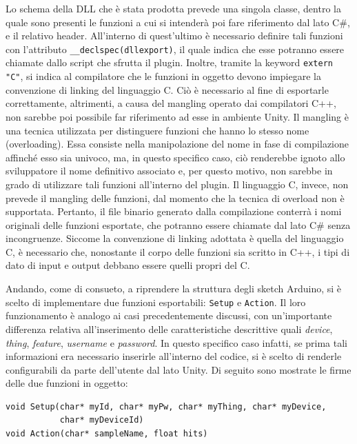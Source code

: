Lo schema della DLL che è stata prodotta prevede una singola classe, dentro la quale sono presenti le funzioni a cui si intenderà poi fare riferimento dal lato C\#, e il relativo header. All'interno di quest'ultimo è necessario definire tali funzioni con l’attributo \texttt{\_\_declspec(dllexport)}, il quale indica che esse potranno essere chiamate dallo script che sfrutta il plugin. Inoltre, tramite la keyword \texttt{extern "C"}, si indica al compilatore che le funzioni in oggetto devono impiegare la convenzione di linking del linguaggio C. Ciò è necessario al fine di esportarle correttamente, altrimenti, a causa del mangling operato dai compilatori C++, non sarebbe poi possibile far riferimento ad esse in ambiente Unity. Il mangling è una tecnica utilizzata per distinguere funzioni che hanno lo stesso nome (overloading). Essa consiste nella manipolazione del nome in fase di compilazione affinché esso sia univoco, ma, in questo specifico caso, ciò renderebbe ignoto allo sviluppatore il nome definitivo associato e, per questo motivo, non sarebbe in grado di utilizzare tali funzioni all'interno del plugin. Il linguaggio C, invece, non prevede il mangling delle funzioni, dal momento che la tecnica di overload non è supportata. Pertanto, il file binario generato dalla compilazione conterrà i nomi originali delle funzioni esportate, che potranno essere chiamate dal lato C\# senza incongruenze. Siccome la convenzione di linking adottata è quella del linguaggio C, è necessario che, nonostante il corpo delle funzioni sia scritto in C++, i tipi di dato di input e output debbano essere quelli propri del C.

Andando, come di consueto, a riprendere la struttura degli sketch Arduino, si è scelto di implementare due funzioni esportabili: \texttt{Setup} e \texttt{Action}. Il loro funzionamento è analogo ai casi precedentemente discussi, con un’importante differenza relativa all’inserimento delle caratteristiche descrittive quali \textit{device}, \textit{thing}, \textit{feature}, \textit{username} e \textit{password}. In questo specifico caso infatti, se prima tali informazioni era necessario inserirle all'interno del codice, si è scelto di renderle configurabili da parte dell'utente dal lato Unity. Di seguito sono mostrate le firme delle due funzioni in oggetto:

\begin{verbatim}
void Setup(char* myId, char* myPw, char* myThing, char* myDevice,
           char* myDeviceId)
void Action(char* sampleName, float hits)
\end{verbatim}

